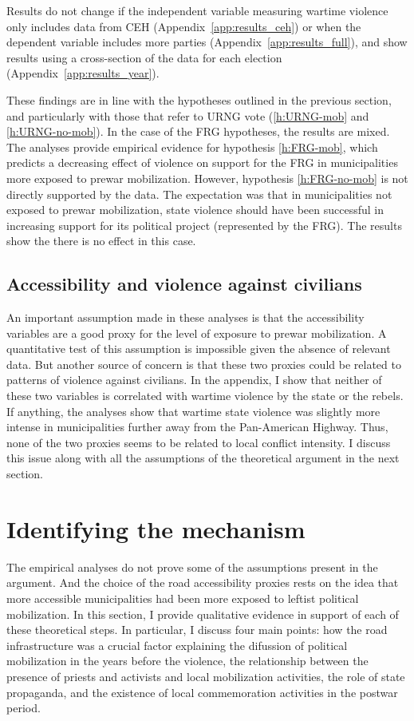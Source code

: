 \documentclass[12pt, notitlepage]{article}
\begin{document}
Results do not change if the independent variable measuring wartime violence only includes data from CEH (Appendix~\ref{app:results_ceh}) or when the dependent variable includes more parties (Appendix~\ref{app:results_full}), and show results using a cross-section of the data for each election (Appendix~\ref{app:results_year}).

These findings are in line with the hypotheses outlined in the previous section, and particularly with those that refer to URNG vote (\ref{h:URNG-mob} and \ref{h:URNG-no-mob}).
In the case of the FRG hypotheses, the results are mixed.
The analyses provide empirical evidence for hypothesis \ref{h:FRG-mob}, which predicts a decreasing effect of violence on support for the FRG in municipalities more exposed to prewar mobilization.
However, hypothesis \ref{h:FRG-no-mob} is not directly supported by the data.
The expectation was that in municipalities not exposed to prewar mobilization, state violence should have been successful in increasing support for its political project (represented by the FRG).
The results show the there is no effect in this case.

\subsection*{Accessibility and violence against civilians}

An important assumption made in these analyses is that the accessibility variables are a good proxy for the level of exposure to prewar mobilization.
A quantitative test of this assumption is impossible given the absence of relevant data.
But another source of concern is that these two proxies could be related to patterns of violence against civilians.
In the appendix, I show that neither of these two variables is correlated with wartime violence by the state or the rebels.
If anything, the analyses show that wartime state violence was slightly more intense in municipalities further away from the Pan-American Highway.
Thus, none of the two proxies seems to be related to local conflict intensity.
I discuss this issue along with all the assumptions of the theoretical argument in the next section.

\section*{Identifying the mechanism}

The empirical analyses do not prove some of the assumptions present in the argument.
And the choice of the road accessibility proxies rests on the idea that more accessible municipalities had been more exposed to leftist political mobilization.
In this section, I provide qualitative evidence in support of each of these theoretical steps.
In particular, I discuss four main points: how the road infrastructure was a crucial factor explaining the difussion of political mobilization in the years before the violence, the relationship between the presence of priests and activists and local mobilization activities, the role of state propaganda, and the existence of local commemoration activities in the postwar period.
\end{document}
